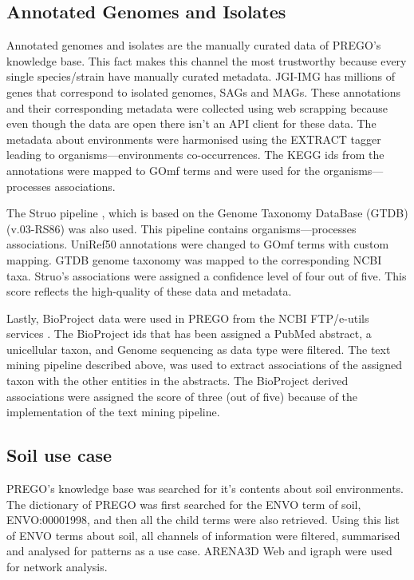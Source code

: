    \subsection{Annotated Genomes and Isolates}
   \label{subsec:prego-isolates}

Annotated genomes and isolates are the manually curated data of PREGO's knowledge base.
This fact makes this channel the most trustworthy because every single species/strain have manually curated metadata. 
JGI-IMG \parencite{chen2021img, mukherjee2021genomes} has millions of genes that 
correspond to isolated genomes, SAGs and MAGs. These annotations and their corresponding metadata
were collected using web scrapping because even though the data are open there isn't an API client for these data.
The metadata about environments were harmonised using the EXTRACT tagger leading to organisms—environments co-occurrences.
The KEGG ids from the annotations were mapped to GOmf terms and were used for the organisms—processes associations.
   
The Struo pipeline \parencite{de2020struo}, which is based on the Genome Taxonomy DataBase (GTDB) (v.03-RS86) \parencite{parks2020complete} was also used.
This pipeline contains organisms—processes associations. 
UniRef50 annotations were changed to GOmf terms with custom mapping. 
GTDB genome taxonomy was mapped to the corresponding NCBI taxa. 
Struo's associations were assigned a confidence level of four out of five. 
This score reflects the high-quality of these data and metadata.
   
Lastly, BioProject data were used in PREGO from the NCBI FTP/e-utils services \parencite{sayers2021database}. 
The BioProject ids that has been assigned a PubMed abstract, a unicellular taxon, and Genome sequencing as data type were filtered.
The text mining pipeline described above, was used to extract associations of the
assigned taxon with the other entities in the abstracts. 
The BioProject derived associations were assigned the score of three (out of five)
because of the implementation of the text mining pipeline.


\subsection{Soil use case}
\label{soil-prego-m}

PREGO's knowledge base was searched for it's contents about soil environments. 
The dictionary of PREGO was first searched for the ENVO term of soil, ENVO:00001998,
and then all the child terms were also retrieved. Using this list of 
ENVO terms about soil, all channels of information were filtered, summarised and 
analysed for patterns as a use case. ARENA3D Web \parencite{karatzas2021arena3dweb} and
igraph \parencite{Csardi2006} were used for network analysis.

